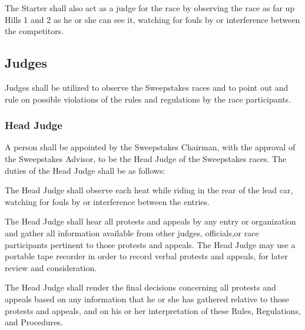 \documentclass[openany]{book}
\begin{document}
The Starter shall also act as a judge for the race by observing the race as far up Hills 1 and 2 as he or she can see it, watching for fouls by or interference between the competitors.

\subsection{Judges}

Judges shall be utilized to observe the Sweepstakes races and to point out and rule on possible violations of the rules and regulations by the race participants.

\subsubsection{Head Judge}

A person shall be appointed by the Sweepstakes Chairman, with the approval of the Sweepstakes Advisor, to be the Head Judge of the Sweepstakes races. The duties of the Head Judge shall be as follows:

The Head Judge shall observe each heat while riding in the rear of the lead car, watching for fouls by or interference between the entries.

The Head Judge shall hear all protests and appeals by any entry or organization and gather all information available from other judges, officials,or race participants pertinent to those protests and appeals. The Head Judge may use a portable tape recorder in order to record verbal protests and appeals, for later review and consideration.

The Head Judge shall render the final decisions concerning all protests and appeals based on any information that he or she has gathered relative to those protests and appeals, and on his or her interpretation of these Rules, Regulations, and Procedures.
\end{document}
